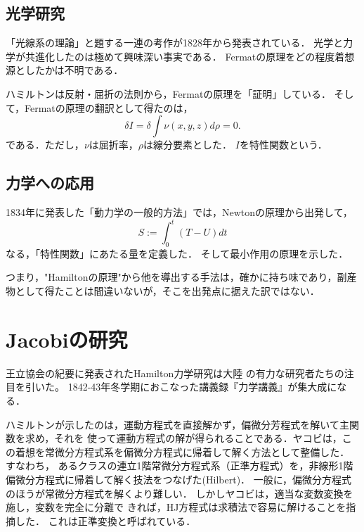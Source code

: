 \documentclass[uplatex,dvipdfmx]{jsreport}
\begin{document}
\subsection{光学研究}

\begin{tcolorbox}[colframe=ForestGreen, colback=ForestGreen!10!white,breakable,colbacktitle=ForestGreen!40!white,coltitle=black,fonttitle=\bfseries\sffamily,
title=]
    「光線系の理論」と題する一連の考作が1828年から発表されている．
    光学と力学が共進化したのは極めて興味深い事実である．
    Fermatの原理をどの程度着想源としたかは不明である．
\end{tcolorbox}

\begin{history}
    ハミルトンは反射・屈折の法則から，Fermatの原理を「証明」している．
    そして，Fermatの原理の翻訳として得たのは，
    \[\delta I=\delta\int\nu(x,y,z)d\rho=0.\]
    である．ただし，$\nu$は屈折率，$\rho$は線分要素とした．
    $I$を特性関数という．
\end{history}

\subsection{力学への応用}

\begin{history}
    1834年に発表した「動力学の一般的方法」\cite{Hamilton34}では，Newtonの原理から出発して，
    \[S:=\int^t_0(T-U)dt\]
    なる，「特性関数」にあたる量を定義した．
    そして最小作用の原理を示した．
\end{history}

\begin{remarks}
    つまり，"Hamiltonの原理"から他を導出する手法は，確かに持ち味であり，副産物として得たことは間違いないが，そこを出発点に据えた訳ではない．
\end{remarks}

\section{Jacobiの研究}

\begin{tcolorbox}[colframe=ForestGreen, colback=ForestGreen!10!white,breakable,colbacktitle=ForestGreen!40!white,coltitle=black,fonttitle=\bfseries\sffamily,
title=]
    王立協会の紀要に発表されたHamilton力学研究は大陸
    の有力な研究者たちの注目を引いた。
    1842-43年冬学期におこなった講義録『力学講義』が集大成になる．

    ハミルトンが示したのは，運動方程式を直接解かず，偏微分芳程式を解いて主関数を求め，それを
    使って運動方程式の解が得られることである．ヤコビは，この着想を常微分方程式系を偏微分方程式に帰着して解く方法として整備した．
    すなわち，
    あるクラスの連立1階常微分方程式系（正準方程式）を，非線形1階偏微分方程式に帰着して解く技法をつなげた(Hilbert\cite{Hilbert37})．
    一般に，偏微分方程式のほうが常微分方程式を解くより難しい．
    しかしヤコビは，適当な変数変換を施し，変数を完全に分離で
    きれば，HJ方程式は求積法で容易に解けることを指摘した．
    これは正準変換と呼ばれている．
\end{tcolorbox}
\end{document}
